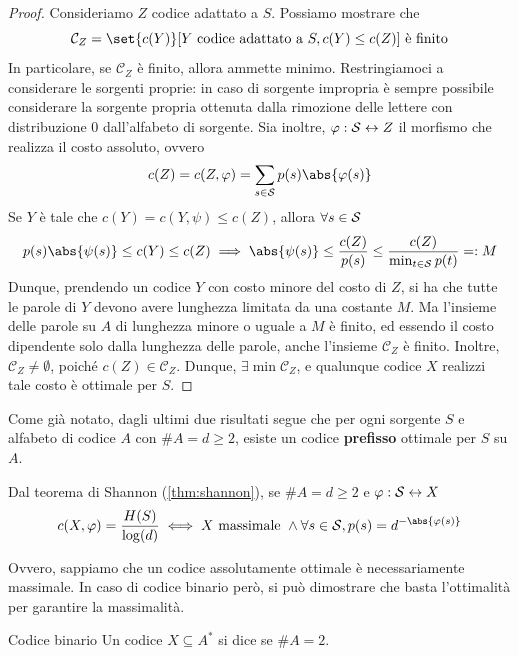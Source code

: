 \begin{proof}
  Consideriamo \(Z\) codice adattato a \(S\). Possiamo mostrare che
  \[\mathcal{C}_Z = \set{c(Y)}[Y \text{ codice adattato a } S, c(Y)\leq c(Z)] \text{ è finito}\]
  In particolare, se \(\mathcal{C}_Z\) è finito, allora ammette minimo.
  Restringiamoci a considerare le sorgenti proprie: in caso di sorgente impropria è sempre possibile considerare la sorgente propria ottenuta dalla rimozione delle lettere con distribuzione \(0\) dall'alfabeto di sorgente.
  Sia inoltre, \(\varphi: \mathcal{S} \leftrightarrow Z\) il morfismo che realizza il costo assoluto, ovvero
  \[c(Z) = c(Z,\varphi) = \sum_{s \in \SCal} p(s)\abs{\varphi(s)}\]
  Se \(Y\) è tale che \(c(Y) = c(Y,\psi) \leq c(Z)\), allora \(\forall s \in \mathcal{S}\)
  \[p(s)\abs{\psi(s)} \leq c(Y) \leq c(Z) \implies \abs{\psi(s)} \leq \frac{c(Z)}{p(s)} \leq \frac{c(Z)}{\min_{t \in \SCal} p(t)} =: M\]
  Dunque, prendendo un codice \(Y\) con costo minore del costo di \(Z\), si ha che tutte le parole di \(Y\) devono avere lunghezza limitata da una costante \(M\).
  Ma l'insieme delle parole su \(A\) di lunghezza minore o uguale a \(M\) è finito, ed essendo il costo dipendente solo dalla lunghezza delle parole, anche l'insieme \(\mathcal{C}_Z\) è finito.
  Inoltre, \(\mathcal{C}_Z\neq \emptyset\), poiché \(c(Z) \in \mathcal{C}_Z\). Dunque, \(\exists \min \mathcal{C}_Z\), e qualunque codice \(X\) realizzi tale costo è ottimale per \(S\).
\end{proof}

\begin{observation}{}
  Come già notato, dagli ultimi due risultati segue che per ogni sorgente \(S\) e alfabeto di codice \(A\) con \(\# A = d \geq 2\), esiste un codice \textbf{prefisso} ottimale per \(S\) su \(A\).
\end{observation}

Dal teorema di Shannon (\ref{thm:shannon}), se \(\#A = d \geq 2\) e \(\varphi: \mathcal{S} \leftrightarrow X\)
\[c(X,\varphi) = \frac{H(S)}{\log(d)} \iff X \text{ massimale } \land \forall s \in \SCal, p(s)=d^{-\abs{\varphi(s)}}\]

Ovvero, sappiamo che un codice assolutamente ottimale è necessariamente massimale. In caso di codice binario però, si può dimostrare che basta l'ottimalità per garantire la massimalità.

\begin{definition}{Codice binario}
  Un codice $X \subseteq A^{*}$ si dice  se $\# A=2$.
\end{definition}

